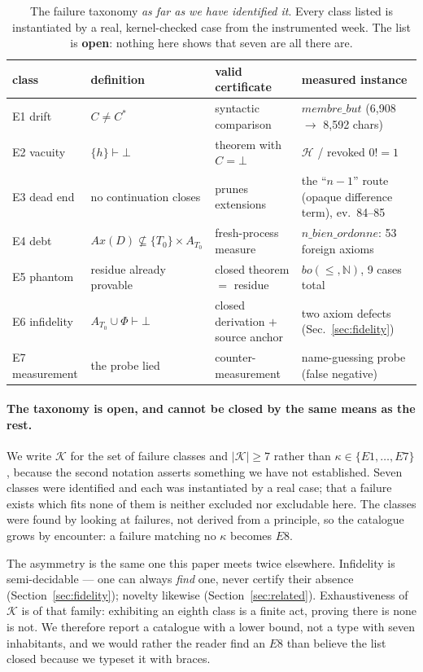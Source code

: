 \documentclass[11pt]{article}
\theoremstyle{remark}\newtheorem{example}{Example}
\begin{document}
\begin{table}[h]\centering\footnotesize
\setlength{\tabcolsep}{4.5pt}
\begin{tabular}{lllp{4.3cm}}
\toprule
class & definition & valid certificate & measured instance \\
\midrule
E1 drift & $C \neq C^\ast$ & syntactic comparison & $\mathit{membre\_but}$ (6{,}908 $\to$ 8{,}592 chars) \\
E2 vacuity & $\{h\} \vdash \bot$ & theorem with $C = \bot$ & $\mathcal{H}$ / revoked $0! = 1$ \\
E3 dead end & no continuation closes & prunes extensions & the ``$n{-}1$'' route (opaque difference term), ev.~84--85 \\
E4 debt & $Ax(D) \not\subseteq \{T_0\}{\times}A_{T_0}$ & fresh-process measure & $n\_bien\_ordonne$: 53 foreign axioms \\
E5 phantom & residue already provable & closed theorem $=$ residue & $bo(\le,\mathbb{N})$, 9 cases total \\
E6 infidelity & $A_{T_0} \cup \Phi \vdash \bot$ & closed derivation $+$ source anchor & two axiom defects (Sec.~\ref{sec:fidelity}) \\
E7 measurement & the probe lied & counter-measurement & name-guessing probe (false negative) \\
\bottomrule
\end{tabular}
\caption{The failure taxonomy \emph{as far as we have identified it}. Every class listed
is instantiated by a real, kernel-checked case from the instrumented week. The list is
\textbf{open}: nothing here shows that seven are all there are.}
\end{table}

\paragraph{The taxonomy is open, and cannot be closed by the same means as the rest.}
We write $\mathcal{K}$ for the set of failure classes and $|\mathcal{K}| \ge 7$ rather
than $\kappa \in \{E1,\dots,E7\}$, because the second notation asserts something we have
not established. Seven classes were identified and each was instantiated by a real case;
that a failure exists which fits none of them is neither excluded nor excludable here.
The classes were found by looking at failures, not derived from a principle, so the
catalogue grows by encounter: a failure matching no $\kappa$ becomes $E8$.

The asymmetry is the same one this paper meets twice elsewhere. Infidelity is
semi-decidable --- one can always \emph{find} one, never certify their absence
(Section~\ref{sec:fidelity}); novelty likewise (Section~\ref{sec:related}). Exhaustiveness
of $\mathcal{K}$ is of that family: exhibiting an eighth class is a finite act, proving
there is none is not. We therefore report a catalogue with a lower bound, not a type with
seven inhabitants, and we would rather the reader find an $E8$ than believe the list
closed because we typeset it with braces.
\end{document}
